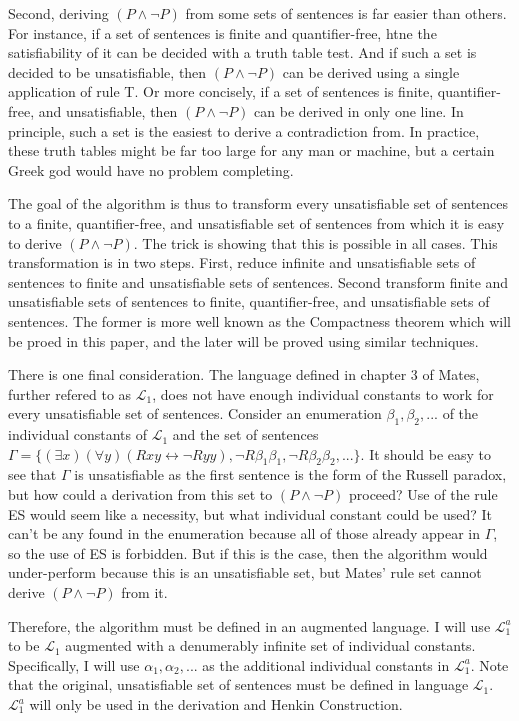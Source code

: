\documentclass[12pt]{article}
\theoremstyle{definition}
\theoremstyle{remark}
\begin{document}
Second, deriving $(P \land \neg P)$ from some sets of sentences is far easier than others. For instance, if a set of sentences is finite and quantifier-free, htne the satisfiability of it can be decided with a truth table test. And if such a set is decided to be unsatisfiable, then $(P \land \neg P)$ can be derived using a single application of rule T. Or more concisely, if a set of sentences is finite, quantifier-free, and unsatisfiable, then $(P \land \neg P)$ can be derived in only one line. In principle, such a set is the easiest to derive a contradiction from. In practice, these truth tables might be far too large for any man or machine, but a certain Greek god would have no problem completing. 

The goal of the algorithm is thus to transform every unsatisfiable set of sentences to a finite, quantifier-free, and unsatisfiable set of sentences from which it is easy to derive $(P \land \neg P)$. The trick is showing that this is possible in all cases. This transformation is in two steps. First, reduce infinite and unsatisfiable sets of sentences to finite and unsatisfiable sets of sentences. Second transform finite and unsatisfiable sets of sentences to finite, quantifier-free, and unsatisfiable sets of sentences. The former is more well known as the Compactness theorem which will be proed in this paper, and the later will be proved using similar techniques.

There is one final consideration. The language defined in chapter 3 of Mates, further refered to as $\mathscr{L}_1$, does not have enough individual constants to work for every unsatisfiable set of sentences. Consider an enumeration $\beta_1, \beta_2, ...$ of the individual constants of $\mathscr{L}_1$ and the set of sentences $\Gamma = \{ (\exists x)(\forall y)(Rxy \leftrightarrow \neg Ryy), \neg R\beta_1\beta_1, \neg R\beta_2\beta_2, ... \}$. It should be easy to see that $\Gamma$ is unsatisfiable as the first sentence is the form of the Russell paradox, but how could a derivation from this set to $(P \land \neg P)$ proceed? Use of the rule ES would seem like a necessity, but what individual constant could be used? It can't be any found in the enumeration because all of those already appear in $\Gamma$, so the use of ES is forbidden. But if this is the case, then the algorithm would under-perform because this is an unsatisfiable set, but Mates' rule set cannot derive $(P \land \neg P)$ from it. 

Therefore, the algorithm must be defined in an augmented language. I will use $\mathscr{L}_1^a$ to be $\mathscr{L}_1$ augmented with a denumerably infinite set of individual constants. Specifically, I will use $\alpha_1, \alpha_2, ...$ as the additional individual constants in $\mathscr{L}_1^a$. Note that the original, unsatisfiable set of sentences must be defined in language $\mathscr{L}_1$. $\mathscr{L}_1^a$ will only be used in the derivation and Henkin Construction.
\end{document}
